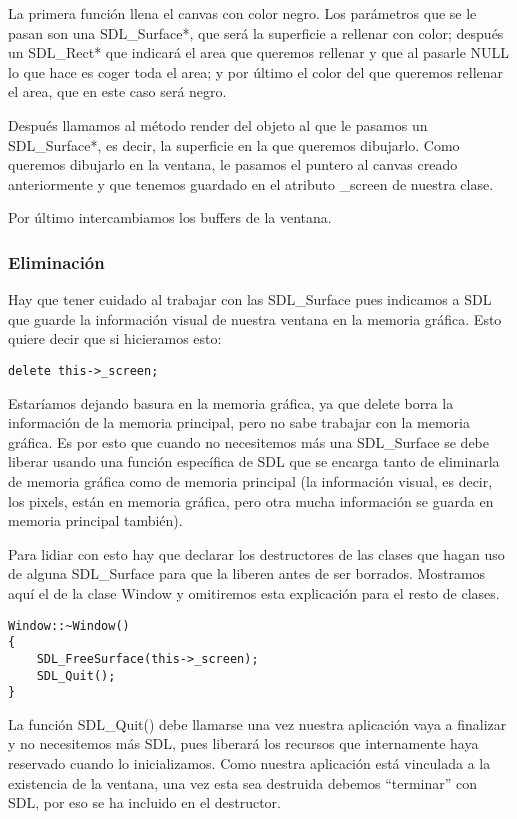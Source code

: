 \documentclass[parskip=half*]{scrartcl}
\begin{document}
				La primera funci\'on llena el canvas con color negro. Los par\'ametros que se le pasan son una SDL\_Surface*, que ser\'a la superficie a rellenar con color; despu\'es un SDL\_Rect* que indicar\'a el area que queremos rellenar y que al pasarle NULL lo que hace es coger toda el area; y por \'ultimo el color del que queremos rellenar el area, que en este caso ser\'a negro. 

				Despu\'es llamamos al m\'etodo render del objeto al que le pasamos un SDL\_Surface*, es decir, la superficie en la que queremos dibujarlo. Como queremos dibujarlo en la ventana, le pasamos el puntero al canvas creado anteriormente y que tenemos guardado en el atributo \_screen de nuestra clase.

				Por \'ultimo intercambiamos los buffers de la ventana.

			\subsubsection{Eliminaci\'on}
				Hay que tener cuidado al trabajar con las SDL\_Surface pues indicamos a SDL que guarde la informaci\'on visual de nuestra ventana en la memoria gr\'afica. Esto quiere decir que si hicieramos esto:

				\begin{lstlisting}
delete this->_screen;
				\end{lstlisting}

				Estar\'iamos dejando basura en la memoria gr\'afica, ya que delete borra la informaci\'on de la memoria principal, pero no sabe trabajar con la memoria gr\'afica. Es por esto que cuando no necesitemos m\'as una SDL\_Surface se debe liberar usando una funci\'on espec\'ifica de SDL que se encarga tanto de eliminarla de memoria gr\'afica como de memoria principal (la informaci\'on visual, es decir, los pixels, est\'an en memoria gr\'afica, pero otra mucha informaci\'on se guarda en memoria principal tambi\'en).

				Para lidiar con esto hay que declarar los destructores de las clases que hagan uso de alguna SDL\_Surface para que la liberen antes de ser borrados. Mostramos aqu\'i el de la clase Window y omitiremos esta explicaci\'on para el resto de clases.

				\begin{lstlisting}
Window::~Window()
{
    SDL_FreeSurface(this->_screen);
    SDL_Quit();
}
				\end{lstlisting}

				La funci\'on SDL\_Quit() debe llamarse una vez nuestra aplicaci\'on vaya a finalizar y no necesitemos m\'as SDL, pues liberar\'a los recursos que internamente haya reservado cuando lo inicializamos. Como nuestra aplicaci\'on est\'a vinculada a la existencia de la ventana, una vez esta sea destruida debemos ``terminar'' con SDL, por eso se ha incluido en el destructor.
\end{document}
